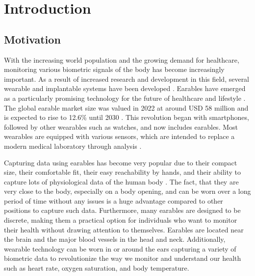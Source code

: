 
\chapter{Introduction}
\label{ch:Introduction}

\section{Motivation}
With the increasing world population and the growing demand for healthcare, monitoring various biometric signals of the body has become increasingly important. 
As a result of increased research and development in this field, several wearable and implantable systems have been developed \cite{loncar-turukaloLiteratureWearableTechnology2019}.
Earables have emerged as a particularly promising technology for the future of healthcare and lifestyle \cite{trespGoingDigitalSurvey2016, kirkWearablesRevolutionStandardization2014a}. 
The global earable market size was valued in 2022 at around USD 58 million and is expected to rise to 12.6\% until 2030 \cite{GlobalEarphonesHeadphones}.
This revolution began with smartphones, followed by other wearables such as watches, and now includes earables. 
Most wearables are equipped with various sensors, which are intended to replace a modern medical laboratory through analysis \cite{loncar-turukaloLiteratureWearableTechnology2019}.

Capturing data using earables has become very popular due to their compact size, their comfortable fit, their easy reachability by hands, and their ability to capture lots of physiological data of the human body \cite{roddigerSensingEarablesSystematic2022a}. 
The fact, that they are very close to the body, especially on a body opening, and can be worn over a long period of time without any issues is a huge advantage compared to other positions to capture such data.
Furthermore, many earables are designed to be discrete, making them a practical option for individuals who want to monitor their health without drawing attention to themselves.
Earables are located near the brain and the major blood vessels in the head and neck.
Additionally, wearable technology can be worn in or around the ears capturing a variety of biometric data to revolutionize the way we monitor and understand our health such as heart rate, oxygen saturation, and body temperature.

